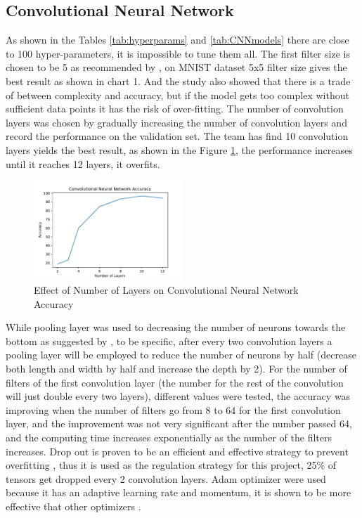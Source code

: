 \documentclass[letterpaper, 10 pt, conference]{ieeeconf}  %
\begin{document}
\subsection{Convolutional Neural Network}
As shown in the Tables \ref{tab:hyperparams} and \ref{tab:CNNmodels} there are close to 100 hyper-parameters, it is impossible to tune them all. The first filter size is chosen to be 5 as recommended by \cite{dhingra2017model}, on MNIST dataset 5x5 filter size gives the best result as shown in chart 1. And the study also showed that there is a trade of between complexity and accuracy, but if the model gets too complex without sufficient data points it has the risk of over-fitting. The number of convolution layers was chosen by gradually increasing the number of convolution layers and record the performance on the validation set. The team has find 10 convolution layers yields the best result, as shown in the Figure \ref{fig:cnnAccuvsLayers}, the performance increases until it reaches 12 layers, it overfits. 
\begin{figure}[h]
	\begin{center}
		\includegraphics[width=0.5\textwidth]{figures/CNNaccuvsLayers.pdf}  %
		\caption{Effect of Number of Layers on Convolutional Neural Network Accuracy}
		\label{fig:cnnAccuvsLayers}
	\end{center}
\end{figure}

While pooling layer was used to decreasing the number of neurons towards the bottom as suggested by \cite{lattner2016}, to be specific, after every two convolution layers a pooling layer will be employed to reduce the number of neurons by half (decrease both length and width by half and increase the depth by 2). For the number of filters of the first convolution layer (the number for the rest of the convolution will just double every two layers), different values were tested, the accuracy was improving when the number of filters go from 8 to 64 for the first convolution layer, and the improvement was not very significant after the number passed 64, and the computing time increases exponentially as the number of the filters increases. Drop out is proven to be an efficient and effective strategy to prevent overfitting \cite{srivastava2014dropout}, thus it is used as the regulation strategy for this project, 25\% of tensors get dropped every 2 convolution layers. Adam optimizer were used because it has an adaptive learning rate and momentum, it is shown to be more effective that other optimizers \cite{walia2017opt}.
\end{document}
